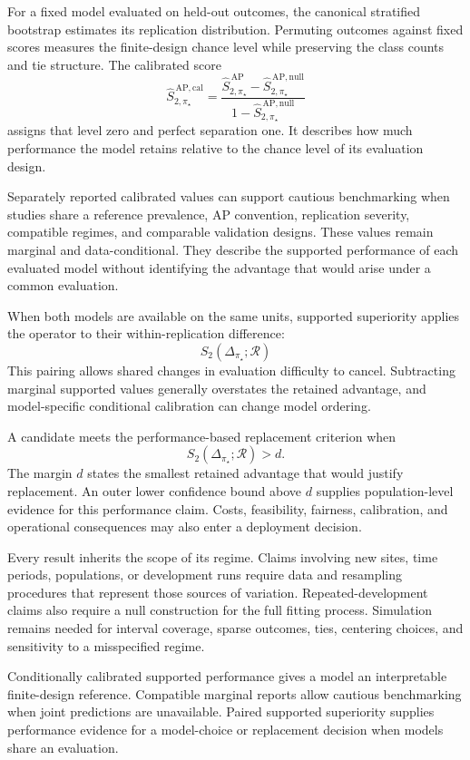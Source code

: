 \documentclass[11pt]{article}
\newcommand{\Regime}{\mathcal{R}}
\newcommand{\SAPHat}{\widehat S_{2,\pi_\star}^{\,\mathrm{AP}}}
\newcommand{\SAPnullHat}{\widehat S_{2,\pi_\star}^{\,\mathrm{AP,null}}}
\newcommand{\SAPcalHat}{\widehat S_{2,\pi_\star}^{\,\mathrm{AP,cal}}}
\theoremstyle{remark}
\begin{document}
For a fixed model evaluated on held-out outcomes, the canonical stratified bootstrap estimates its replication distribution. Permuting outcomes against fixed scores measures the finite-design chance level while preserving the class counts and tie structure. The calibrated score
\[
\SAPcalHat
=
\frac{\SAPHat-\SAPnullHat}{1-\SAPnullHat}
\]
assigns that level zero and perfect separation one. It describes how much performance the model retains relative to the chance level of its evaluation design.

Separately reported calibrated values can support cautious benchmarking when studies share a reference prevalence, AP convention, replication severity, compatible regimes, and comparable validation designs. These values remain marginal and data-conditional. They describe the supported performance of each evaluated model without identifying the advantage that would arise under a common evaluation.

When both models are available on the same units, supported superiority applies the operator to their within-replication difference:
\[
S_2(\Delta_{\pi_\star};\Regime)
\]
This pairing allows shared changes in evaluation difficulty to cancel. Subtracting marginal supported values generally overstates the retained advantage, and model-specific conditional calibration can change model ordering.

A candidate meets the performance-based replacement criterion when
\[
S_2(\Delta_{\pi_\star};\Regime)>d.
\]
The margin $d$ states the smallest retained advantage that would justify replacement. An outer lower confidence bound above $d$ supplies population-level evidence for this performance claim. Costs, feasibility, fairness, calibration, and operational consequences may also enter a deployment decision.

Every result inherits the scope of its regime. Claims involving new sites, time periods, populations, or development runs require data and resampling procedures that represent those sources of variation. Repeated-development claims also require a null construction for the full fitting process. Simulation remains needed for interval coverage, sparse outcomes, ties, centering choices, and sensitivity to a misspecified regime.

Conditionally calibrated supported performance gives a model an interpretable finite-design reference. Compatible marginal reports allow cautious benchmarking when joint predictions are unavailable. Paired supported superiority supplies performance evidence for a model-choice or replacement decision when models share an evaluation.
\end{document}
